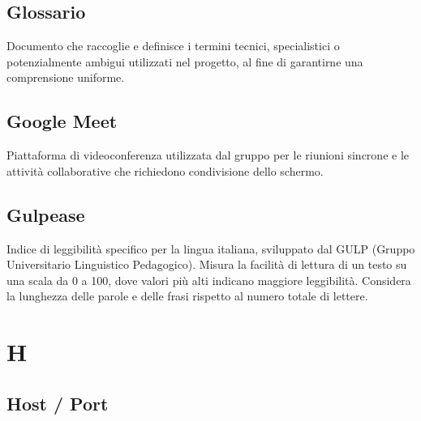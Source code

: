 \documentclass[a4paper, 11pt, oneside]{scrartcl} %
\begin{document}
\vspace{0.5cm}

\subsection*{Glossario}


Documento che raccoglie e definisce i termini tecnici, specialistici o potenzialmente ambigui utilizzati nel progetto, al fine di garantirne una comprensione uniforme.

\vspace{0.5cm}

\subsection*{Google Meet}


Piattaforma di videoconferenza utilizzata dal gruppo per le riunioni sincrone e le attività collaborative che richiedono condivisione dello schermo.

\vspace{0.5cm}

\subsection*{Gulpease}
Indice di leggibilità specifico per la lingua italiana, sviluppato dal GULP (Gruppo Universitario Linguistico Pedagogico). Misura la facilità di lettura di un testo su una scala da 0 a 100, dove valori più alti indicano maggiore leggibilità. Considera la lunghezza delle parole e delle frasi rispetto al numero totale di lettere.
\vspace{0.5cm}



\section*{H}


\subsection*{Host / Port}

\end{document}
